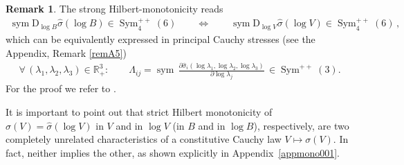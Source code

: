 \documentclass[10pt]{article}
\newcounter{theoremCounter}
\numberwithin{theoremCounter}{section}
\theoremstyle{plain}
\theoremstyle{definition}
\newtheorem{rem}[theoremCounter]{Remark}
\newcommand{\R}{\mathbb{R}}
\newcommand{\DD}{\mathrm{D}}
\DeclareMathOperator{\Sym}{Sym}
\DeclareMathOperator{\sym}{sym}
\numberwithin{equation}{section}
\begin{document}
	\begin{rem}
	\label{rem4.4}
	The strong Hilbert-monotonicity reads
		\begin{align}
		\label{eqappendix22}
		\sym \DD_{\log B} \widehat{\sigma}(\log B) \in \Sym^{++}_4(6) \qquad \iff \qquad \sym \DD_{\log V} \widehat{\sigma}(\log V) \in \Sym^{++}_4(6) \, ,
		\end{align}
	which can be equivalently expressed in principal Cauchy stresses (see the Appendix, Remark \ref{remA5})
		\begin{align}
		\forall \, (\lambda_1, \lambda_2, \lambda_3) \in \R^3_+: \qquad \Lambda_{ij} = \sym \, \frac{\partial \widehat{\sigma}_i (\log \lambda_1, \log \lambda_2, \log \lambda_3)}{\partial \log \lambda_j} \, \in \Sym^{++}(3).
		\end{align}
		For the proof we refer to \cite{tobedone}.
	\end{rem}
%
%
It is important to point out that strict Hilbert monotonicity of $\sigma(V) = \widehat \sigma(\log V)$ in $V$ and in $\log V$ (in $B$ and in $\log B$), respectively, are two completely unrelated characteristics of a constitutive Cauchy law $V \mapsto \sigma(V)$. In fact, neither implies the other, as shown explicitly in Appendix~\ref{appmono001}.
%
\end{document}
